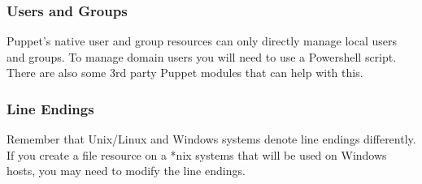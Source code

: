 \documentclass[10pt]{beamer}
\begin{document}
\begin{frame}
  \frametitle{Users and Groups}
  Puppet's native user and group resources can only directly manage local users and groups.  To manage domain users you will need to use a Powershell script. There are also some 3rd party Puppet modules that can help with this.

\end{frame}
\begin{frame}
  \frametitle{Line Endings}

  Remember that Unix/Linux and Windows systems denote line endings differently.  If you 
  create a file resource on a *nix systems that will be used on Windows hosts, you may need 
  to modify the line endings.

\end{frame}
\end{document}
